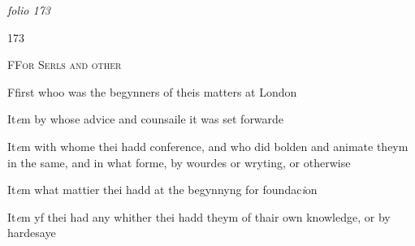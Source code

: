 \documentclass[12pt, a4paper]{book}
\begin{document}
\textit{folio 173}



\begin{flushright}{\color{Mahogany}173}\end{flushright}
            		
				\begin{center} \begin{large} {\scshape FFor Serls and other} \end{large} \end{center}
			
            		


				\marginpar[\vspace{0.5cm}{\textcolor{Gray}{1}}]{}
			 
		\ifthenelse{\isodd{\thepage}}
		{\reversemarginpar}
		{\normalmarginpar}
		Ffirst whoo was the begynners of theis matters at London

            		

				\marginpar[\vspace{0.5cm}{\textcolor{Gray}{2}}]{}
			 

		\ifthenelse{\isodd{\thepage}}
		{\reversemarginpar}
		{\normalmarginpar}
		It\textit{e}m by whose advice and counsaile it was set forwarde
            		

				\marginpar[\vspace{0.5cm}{\textcolor{Gray}{ 3}}]{}
			 
	
		\ifthenelse{\isodd{\thepage}}
		{\reversemarginpar}
		{\normalmarginpar}
		It\textit{e}m with whome thei hadd conference, and who did bolden and animate theym in the same, and in what forme, by wourdes or wryting, or otherwise 
            		

				\marginpar[\vspace{0.5cm}{\textcolor{Gray}{4}}]{}
			 
	
		\ifthenelse{\isodd{\thepage}}
		{\reversemarginpar}
		{\normalmarginpar}
		It\textit{e}m what mattier thei hadd at the begynnyng for foundac\textit{i}on 
            		

				\marginpar[\vspace{0.5cm}{\textcolor{Gray}{v}}]{}
			 
	
		\ifthenelse{\isodd{\thepage}}
		{\reversemarginpar}
		{\normalmarginpar}
		It\textit{e}m yf thei had any whither thei hadd theym of thair own knowledge, or by hardesaye
            		

				\marginpar[\vspace{0.5cm}{\textcolor{Gray}{vi}}]{}
			 
\end{document}
